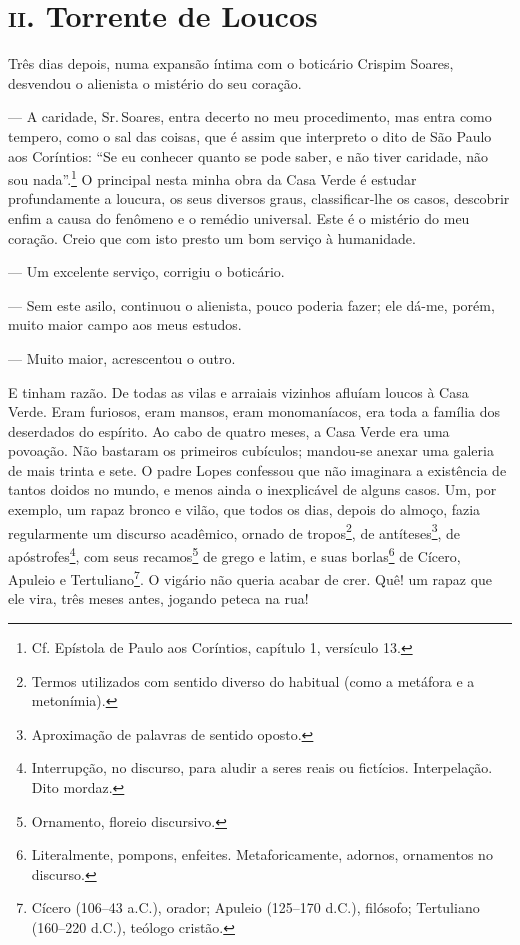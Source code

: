 \chapter{\textsc{ii}. Torrente de Loucos}

Três dias depois, numa expansão íntima com o boticário Crispim Soares,
desvendou o alienista o mistério do seu coração.

--- A caridade, Sr.\,Soares, entra decerto no meu procedimento, mas entra
como tempero, como o sal das coisas, que é assim que interpreto o dito
de São Paulo aos Coríntios: ``Se eu conhecer quanto se pode saber, e não
tiver caridade, não sou nada''.\footnote{Cf. Epístola de Paulo aos
  Coríntios, capítulo 1, versículo 13.} O principal nesta minha obra da
Casa Verde é estudar profundamente a loucura, os seus diversos graus,
classificar-lhe os casos, descobrir enfim a causa do fenômeno e o
remédio universal. Este é o mistério do meu coração. Creio que com isto
presto um bom serviço à humanidade.

--- Um excelente serviço, corrigiu o boticário.

--- Sem este asilo, continuou o alienista, pouco poderia fazer; ele
dá-me, porém, muito maior campo aos meus estudos.

--- Muito maior, acrescentou o outro.

E tinham razão. De todas as vilas e arraiais vizinhos afluíam loucos à
Casa Verde. Eram furiosos, eram mansos, eram monomaníacos, era toda a
família dos deserdados do espírito. Ao cabo de quatro meses, a Casa
Verde era uma povoação. Não bastaram os primeiros cubículos; mandou-se
anexar uma galeria de mais trinta e sete. O padre Lopes confessou que
não imaginara a existência de tantos doidos no mundo, e menos ainda o
inexplicável de alguns casos. Um, por exemplo, um rapaz bronco e vilão,
que todos os dias, depois do almoço, fazia regularmente um discurso
acadêmico, ornado de tropos\footnote{Termos utilizados com sentido
  diverso do habitual (como a metáfora e a metonímia).}, de
antíteses\footnote{Aproximação de palavras de sentido oposto.}, de
apóstrofes\footnote{Interrupção, no discurso, para aludir a seres reais
  ou fictícios. Interpelação. Dito mordaz.}, com seus recamos\footnote{Ornamento,
  floreio discursivo.} de grego e latim, e suas borlas\footnote{Literalmente,
  pompons, enfeites. Metaforicamente, adornos, ornamentos no discurso.}
de Cícero, Apuleio e Tertuliano\footnote{Cícero (106--43 a.C.), orador;
  Apuleio (125--170 d.C.), filósofo; Tertuliano (160--220 d.C.), teólogo
  cristão.}. O vigário não queria acabar de crer. Quê! um rapaz que ele
vira, três meses antes, jogando peteca na rua!

